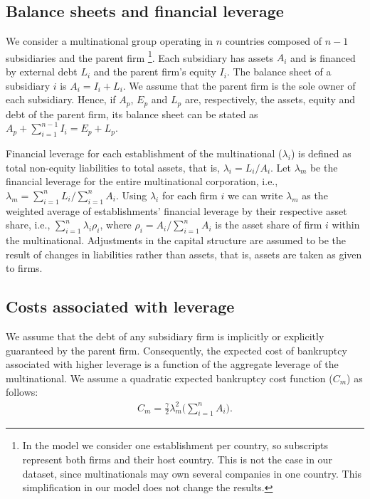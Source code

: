 \documentclass[12pt]{article}
\begin{document}
\subsection{Balance sheets and financial leverage}
	\label{subsec:balancesheet}
	We consider a multinational group operating in $n$ countries composed of $n-1$ subsidiaries and the parent firm \footnote{In the model we consider one establishment per country, so subscripts represent both firms and their host country. This is not the case in our dataset, since multinationals may own several companies in one country. This simplification in our model does not change the results.}. Each subsidiary has assets $A_i$ and is financed by external debt $L_i$ and the parent firm's equity $I_i$. The balance sheet of a subsidiary $i$ is $A_i=I_i+L_i$. We assume that the parent firm is the sole owner of each subsidiary. Hence, if $A_p$, $E_p$ and $L_p$ are, respectively, the assets, equity and debt of the parent firm, its balance sheet can be stated as $A_p+\sum_{i=1}^{n-1}I_i=E_p+L_p$.

	Financial leverage for each establishment of the multinational ($\lambda_i$) is defined as total non-equity liabilities to total assets, that is,  $\lambda_i=L_i/A_i$. Let $\lambda_m$ be the financial leverage for the entire multinational corporation, i.e., $\lambda_m=\sum_{i=1}^{n}L_i/\sum_{i=1}^{n}A_i$. Using $\lambda_i$ for each firm $i$ we can write $\lambda_m$ as the weighted average of establishments' financial leverage by their respective asset share, i.e., $\sum_{i=1}^{n}\lambda_i\rho_i$, where $\rho_i=A_i/\sum_{i=1}^{n}A_i$ is the asset share of firm $i$ within the multinational. Adjustments in the capital structure are assumed to be the result of changes in liabilities rather than assets, that is, assets are taken as given to firms.
	
	\subsection{Costs associated with leverage}
	\label{subsec:costs}
	We assume that the debt of any subsidiary firm is implicitly or explicitly guaranteed by the parent firm. Consequently, the expected cost of bankruptcy associated with higher leverage is  a function of the aggregate leverage of the multinational. We assume a quadratic expected bankruptcy cost function ($C_m$) as follows:
	\begin{equation}
	\begin{aligned}
	C_m=\frac{\gamma}{2}\lambda_m^2\bigg(\sum_{i=1}^{n}A_i\bigg).
	\end{aligned}
	\label{eq:cost bankruptcy}
	\end{equation}
	
\end{document}
